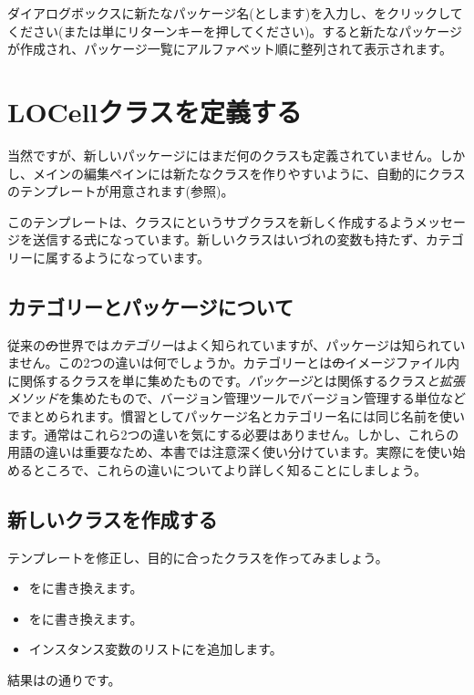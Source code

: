 \documentclass[a4paper,10pt,twoside]{book}
\begin{document}
ダイアログボックスに新たなパッケージ名(とします)を入力し、をクリックしてください(または単にリターンキーを押してください)。すると新たなパッケージが作成され、パッケージ一覧にアルファベット順に整列されて表示されます。


\section{LOCellクラスを定義する}

当然ですが、新しいパッケージにはまだ何のクラスも定義されていません。しかし、メインの編集ペインには新たなクラスを作りやすいように、自動的にクラスのテンプレートが用意されます(参照)。

このテンプレートは、クラスにというサブクラスを新しく作成するようメッセージを送信する\st 式になっています。新しいクラスはいづれの変数も持たず、カテゴリーに属するようになっています。

\subsection{カテゴリーとパッケージについて}

従来の\st の世界では\emph{カテゴリー}はよく知られていますが、パッケージは知られていません。この2つの違いは何でしょうか。カテゴリーとは\st のイメージファイル内に関係するクラスを単に集めたものです。\emph{パッケージ}とは関係するクラス\emph{と拡張メソッド}を集めたもので、バージョン管理ツールでバージョン管理する単位などでまとめられます。慣習としてパッケージ名とカテゴリー名には同じ名前を使います。通常はこれら2つの違いを気にする必要はありません。しかし、これらの用語の違いは重要なため、本書では注意深く使い分けています。実際にを使い始めるところで、これらの違いについてより詳しく知ることにしましょう。


\subsection{新しいクラスを作成する}

テンプレートを修正し、目的に合ったクラスを作ってみましょう。

\begin{itemize}
  \item {}をに書き換えます。
  \item {}をに書き換えます。
  \item インスタンス変数のリストにを追加します。
\end{itemize}
結果はの通りです。
\end{document}
